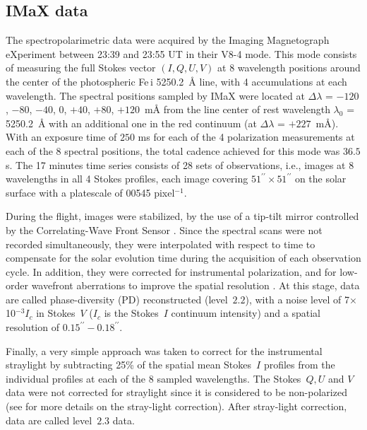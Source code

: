 \documentclass[goettingen, gauss, print]{thesis}
\begin{document}
\subsection{IMaX data}
\label{imax}
The spectropolarimetric data were acquired by the Imaging Magnetograph eXperiment \citep[IMaX;][]{martinezpillet_imaging_2011} between 23:39 and 23:55 UT in their V8-4 mode. This mode consists of measuring the full Stokes vector $(I,Q,U,V)$ at 8 wavelength positions around the center of the photospheric Fe\,{\sc i} 5250.2\, \AA{} line, with 4 accumulations at each wavelength. The spectral positions sampled by IMaX were located at $\Delta \lambda$ = $-120$, $-80$, $-40$, $0$, $+40$, $+80$, $+120$\, m\AA{} from the line center of rest wavelength $\lambda_0$ = 5250.2\, \AA{} with an additional one in the red continuum (at $\Delta \lambda$ = $+227$\, m\AA{}).
With an exposure time of $250$ ms for each of the 4 polarization measurements at each of the 8 spectral positions, the total cadence achieved for this mode was $36.5$ s. The 17 minutes time series consists of 28 sets of observations, i.e., images at 8 wavelengths in all 4 Stokes profiles, each image covering $51^{\prime\prime}\times51^{\prime\prime}$ on the solar surface with a platescale of 0\carcsec{}0545 pixel$^{-1}$.

During the flight, images were stabilized, by the use of a tip-tilt mirror controlled by the Correlating-Wave Front Sensor \citep[CWS;][]{berkefeld_wave-front_2011}.
Since the spectral scans were not recorded simultaneously, they were interpolated with respect to time to compensate for the solar evolution time during the acquisition of each observation cycle. In addition, they were corrected for instrumental polarization, and for low-order wavefront aberrations to improve the spatial resolution \citep{martinezpillet_imaging_2011}. At this stage, data are called phase-diversity (PD) reconstructed (level~$2.2$), with a noise level of 7$\times$10$^{-3} I_c$ in Stokes~$V$ ($I_c$ is the Stokes~$I$ continuum intensity) and a spatial resolution of $0.15^{\prime\prime}-0.18^{\prime\prime}$. 

Finally, a very simple approach was taken to correct for the instrumental straylight by subtracting 25\% of the spatial mean Stokes~$I$ profiles from the individual profiles at each of the 8 sampled wavelengths. The Stokes~$Q,U$ and $V$ data were not corrected for straylight since it is considered to be non-polarized (see \cite{riethmuller_new_2017} for more details on the stray-light correction). After stray-light correction, data are called level~$2.3$ data.
\end{document}
